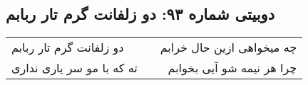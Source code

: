 \begin{center}
\section*{دوبیتی شماره ۹۳: دو زلفانت گرم تار ربابم}
\label{sec:093}
\begin{longtable}{l p{0.5cm} r}
دو زلفانت گرم تار ربابم
&&
چه میخواهی ازین حال خرابم
\\
ته که با مو سر یاری نداری
&&
چرا هر نیمه شو آیی بخوابم
\\
\end{longtable}
\end{center}
